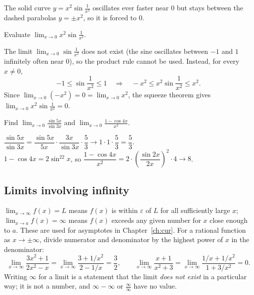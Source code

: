 \begin{center}

{\small The solid curve $y=x^2\sin\frac1{x^2}$ oscillates ever faster near $0$ but stays between the dashed parabolas $y=\pm x^2$, so it is forced to $0$.}
\end{center}

\begin{example}[DU 3553 Q1(a)(i)]
Evaluate $\displaystyle\lim_{x\to0}x^2\sin\frac{1}{x^2}$.
\end{example}
\begin{solution}
The limit $\lim_{x\to0}\sin\frac1{x^2}$ does not exist (the sine oscillates between $-1$ and $1$ infinitely often near $0$), so the product rule cannot be used. Instead, for every $x\ne0$,
\[
-1\le\sin\frac1{x^2}\le1\quad\Longrightarrow\quad -x^2\le x^2\sin\frac1{x^2}\le x^2 .
\]
Since $\lim_{x\to0}(-x^2)=0=\lim_{x\to0}x^2$, the squeeze theorem gives $\displaystyle\lim_{x\to0}x^2\sin\frac1{x^2}=0$.
\end{solution}

\begin{example}[Twisted]
Find $\displaystyle\lim_{x\to0}\frac{\sin 5x}{\sin 3x}$ and $\displaystyle\lim_{x\to0}\frac{1-\cos 4x}{x^2}$.
\end{example}
\begin{solution}
$\dfrac{\sin5x}{\sin3x}=\dfrac{\sin5x}{5x}\cdot\dfrac{3x}{\sin3x}\cdot\dfrac53\to1\cdot1\cdot\dfrac53=\dfrac53$.\\[3pt]
$1-\cos4x=2\sin^22x$, so $\dfrac{1-\cos4x}{x^2}=2\cdot\left(\dfrac{\sin2x}{2x}\right)^2\cdot4\to8$.
\end{solution}

\subsection{Limits involving infinity}
$\lim_{x\to\infty}f(x)=L$ means $f(x)$ is within $\varepsilon$ of $L$ for all sufficiently large $x$; $\lim_{x\to a}f(x)=\infty$ means $f(x)$ exceeds any given number for $x$ close enough to $a$. These are used for asymptotes in Chapter~\ref{ch:cur}. For a rational function as $x\to\pm\infty$, divide numerator and denominator by the highest power of $x$ in the denominator:
\[
\lim_{x\to\infty}\frac{3x^2+1}{2x^2-x}=\lim_{x\to\infty}\frac{3+1/x^2}{2-1/x}=\frac32,\qquad \lim_{x\to\infty}\frac{x+1}{x^2+3}=\lim_{x\to\infty}\frac{1/x+1/x^2}{1+3/x^2}=0 .
\]
Writing $\infty$ for a limit is a statement that the limit \emph{does not exist} in a particular way; it is not a number, and $\infty-\infty$ or $\frac\infty\infty$ have no value.

